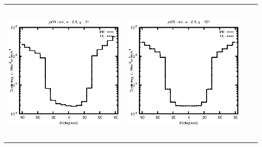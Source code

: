 \begin{tabular}{c c c c}
\includegraphics[height=7cm]{../eps/jol06_Ld_ir_fwd.eps} &
\includegraphics[height=7cm]{../eps/jol06_Ld_ir_cross.eps} \\
\end{tabular}

\pagebreak


